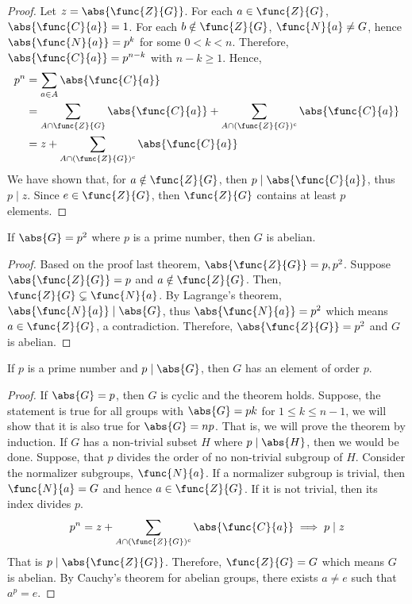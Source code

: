 \begin{proof}
    Let \(z = \abs{\func{Z}{G}}\). For each \(a \in \func{Z}{G}\), \(\abs{\func{C}{a} }= 1\). For each \(b \notin \func{Z}{G}\), \(\func{N}{a} \neq G\), hence \(\abs{\func{N}{a}} = p^{k}\) for some \(0 < k < n\). Therefore, \(\abs{\func{C}{a}} = p^{n - k}\) with \(n - k \geq 1\). Hence, 
    \begin{align*}
        p^n &= \sum_{a \in A} \abs{\func{C}{a}} \\
        &= \sum_{A \cap \func{Z}{G}} \abs{\func{C}{a}} + \sum_{A \cap (\func{Z}{G})^c} \abs{\func{C}{a}}\\
        &= z + \sum_{A \cap (\func{Z}{G})^c} \abs{\func{C}{a}}
    \end{align*}
    We have shown that, for \(a \notin \func{Z}{G}\), then \(p \mid \abs{\func{C}{a}}\), thus \(p \mid z\). Since \(e \in \func{Z}{G}\), then \(\func{Z}{G}\) contains at least \(p\) elements.
\end{proof}

\begin{corollary}
    If \(\abs{G} = p^2\) where \(p\) is a prime number, then \(G\) is abelian.
\end{corollary}

\begin{proof}
    Based on the proof last theorem, \(\abs{\func{Z}{G}}= p,p^2\). Suppose \(\abs{\func{Z}{G}} = p\) and \(a \notin \func{Z}{G}\). Then, \(\func{Z}{G} \subsetneq \func{N}{a}\). By Lagrange's theorem, \(\abs{\func{N}{a}} \mid \abs{G}\), thus \(\abs{\func{N}{a}} = p^2\) which means \(a \in \func{Z}{G}\), a contradiction. Therefore, \(\abs{\func{Z}{G}} = p^2\) and \(G\) is abelian.
\end{proof}

\begin{theorem}[Cauchy]
    If \(p\) is a prime number and \(p \mid \abs{G}\), then \(G\) has an element of order \(p\).
\end{theorem}

\begin{proof}
    If \(\abs{G} = p\), then \(G\) is cyclic and the theorem holds. Suppose, the statement is true for all groups with \(\abs{G} = pk\) for \(1 \leq k \leq n-1\), we will show that it is also true for \(\abs{G} = np\). That is, we will prove the theorem by induction. If \(G\) has a non-trivial subset \(H\) where \(p \mid \abs{H}\), then we would be done. Suppose, that \(p\) divides the order of no non-trivial subgroup of \(H\). Consider the normalizer subgroups, \(\func{N}{a}\). If a normalizer subgroup is trivial, then \(\func{N}{a} = G\) and hence \(a \in \func{Z}{G}\). If it is not trivial, then its index divides \(p\). 
    \begin{equation*}
        p^n = z + \sum_{A \cap (\func{Z}{G})^c} \abs{\func{C}{a}} \implies p \mid z
    \end{equation*} 
    That is \(p \mid \abs{\func{Z}{G}}\). Therefore, \(\func{Z}{G} = G\) which means \(G\) is abelian. By Cauchy's theorem for abelian groups, there exists \(a \neq e\) such that \(a^p = e\).
\end{proof}

